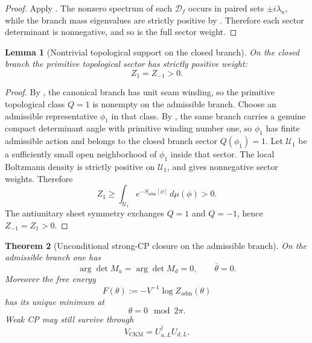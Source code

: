 \documentclass[11pt,a4paper]{article}
\newtheorem{theorem}{Theorem}[section]
\newtheorem{lemma}[theorem]{Lemma}
\theoremstyle{definition}
\theoremstyle{remark}
\begin{document}
\begin{proof}
Apply . The nonzero spectrum of each $\mathcal D_f$ occurs in
paired sets $\pm i\lambda_n$, while the branch mass eigenvalues are strictly positive by
. Therefore each sector determinant is nonnegative, and so is the
full sector weight.
\end{proof}

\begin{lemma}[Nontrivial topological support on the closed branch]
\label{lem:nontrivial-topological-support}
On the closed branch the primitive topological sector has strictly positive weight:
\[
Z_1=Z_{-1}>0.
\]
\end{lemma}

\begin{proof}
By , the canonical branch has unit seam winding, so the primitive
topological class $Q=1$ is nonempty on the admissible branch. Choose an admissible representative
$\phi_1$ in that class. By , the same branch carries a genuine compact
determinant angle with primitive winding number one, so $\phi_1$ has finite admissible action and
belongs to the closed branch sector $Q(\phi_1)=1$. Let $\mathcal U_1$ be a sufficiently small open
neighborhood of $\phi_1$ inside that sector. The local Boltzmann density is strictly positive on
$\mathcal U_1$, and  gives nonnegative sector weights.
Therefore
\[
Z_1
\ge
\int_{\mathcal U_1} e^{-S_{\mathrm{adm}}[\phi]}\,d\mu(\phi)
>
0.
\]
The antiunitary sheet symmetry exchanges $Q=1$ and $Q=-1$, hence $Z_{-1}=Z_1>0$.
\end{proof}

\begin{theorem}[Unconditional strong-CP closure on the admissible branch]
\label{thm:strong-cp-closure}
\label{thm:strong-cp-closure-positive}
On the admissible branch one has
\[
\arg\det M_u=\arg\det M_d=0,
\qquad
\bar\theta=0.
\]
Moreover the free energy
\[
F(\theta):=-V^{-1}\log Z_{\mathrm{adm}}(\theta)
\]
has its unique minimum at
\[
\theta=0\!\!\mod 2\pi.
\]
Weak CP may still survive through
\[
V_{\mathrm{CKM}}=U_{u,L}^\dagger U_{d,L}.
\]
\end{theorem}
\end{document}
